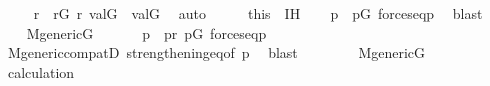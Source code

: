 \begin{isabellebody}
\ \ \isamarkupfalse%
\ {\isasymsigma}\ r\ \ {\isachardoublequoteopen}r{\isasymin}G{\isachardoublequoteclose}\ {\isachardoublequoteopen}{\isasymlangle}{\isasymsigma}{\isacharcomma}{\kern0pt}r{\isasymrangle}{\isasymin}{\isasymtau}{\isachardoublequoteclose}\ {\isachardoublequoteopen}val{\isacharparenleft}{\kern0pt}G{\isacharcomma}{\kern0pt}{\isasympi}{\isacharparenright}{\kern0pt}\ {\isacharequal}{\kern0pt}\ val{\isacharparenleft}{\kern0pt}G{\isacharcomma}{\kern0pt}{\isasymsigma}{\isacharparenright}{\kern0pt}{\isachardoublequoteclose}\ \isamarkupfalse%
\ auto\isanewline
\ \ \isamarkupfalse%
\ \isamarkupfalse%
\ this\ \ IH\isanewline
\ \ \isamarkupfalse%
\ p{\isacharprime}{\kern0pt}\ \ {\isachardoublequoteopen}p{\isacharprime}{\kern0pt}{\isasymin}G{\isachardoublequoteclose}\ {\isachardoublequoteopen}forces{\isacharunderscore}{\kern0pt}eq{\isacharparenleft}{\kern0pt}p{\isacharprime}{\kern0pt}{\isacharcomma}{\kern0pt}{\isasympi}{\isacharcomma}{\kern0pt}{\isasymsigma}{\isacharparenright}{\kern0pt}{\isachardoublequoteclose}\ \isamarkupfalse%
\ blast\isanewline
\ \ \isamarkupfalse%
\isanewline
\ \ \isamarkupfalse%
\ {\isacartoucheopen}M{\isacharunderscore}{\kern0pt}generic{\isacharparenleft}{\kern0pt}G{\isacharparenright}{\kern0pt}{\isacartoucheclose}\isanewline
\ \ \isamarkupfalse%
\isanewline
\ \ \isamarkupfalse%
\ p\ \ {\isachardoublequoteopen}p{\isasympreceq}r{\isachardoublequoteclose}\ {\isachardoublequoteopen}p{\isasymin}G{\isachardoublequoteclose}\ {\isachardoublequoteopen}forces{\isacharunderscore}{\kern0pt}eq{\isacharparenleft}{\kern0pt}p{\isacharcomma}{\kern0pt}{\isasympi}{\isacharcomma}{\kern0pt}{\isasymsigma}{\isacharparenright}{\kern0pt}{\isachardoublequoteclose}\ \isanewline
\ \ \ \ \isamarkupfalse%
\ M{\isacharunderscore}{\kern0pt}generic{\isacharunderscore}{\kern0pt}compatD\ strengthening{\isacharunderscore}{\kern0pt}eq{\isacharbrackleft}{\kern0pt}of\ p{\isacharprime}{\kern0pt}{\isacharbrackright}{\kern0pt}\ \isamarkupfalse%
\ blast\isanewline
\ \ \isamarkupfalse%
\ \isanewline
\ \ \isamarkupfalse%
\ {\isacartoucheopen}M{\isacharunderscore}{\kern0pt}generic{\isacharparenleft}{\kern0pt}G{\isacharparenright}{\kern0pt}{\isacartoucheclose}\isanewline
\ \ \isamarkupfalse%
\ \isamarkupfalse%
\ calculation\isanewline

\end{isabellebody}
